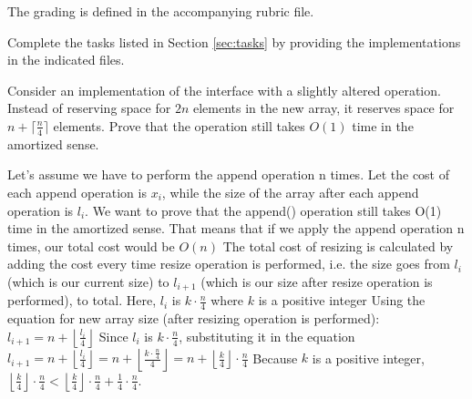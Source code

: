 \documentclass[addpoints]{exam}
\begin{document}
The grading is defined in the accompanying rubric file.
\begin{questions}
   Complete the tasks listed in Section \ref{sec:tasks} by providing the implementations in the indicated files.


  Consider an  implementation of the  interface with a slightly altered  operation. Instead of reserving space for $2n$ elements in the new array, it reserves space for $n + \lceil \frac{n}{4} \rceil$ elements. Prove that the  operation still takes $O(1)$ time in the amortized sense.
  \begin{solution}
    \newline
    Let's assume we have to perform the append operation n times. 
    Let the cost of each append operation is $x_i$, while the size of the array after each append operation is $l_i$. 
    \newline
    \newline
    We want to prove that the append() operation still takes O(1) time in the amortized sense.
    That means that if we apply the append operation n times, our total cost would be $O(n)$
    \newline
    \newline
    The total cost of resizing is calculated by adding the cost every time resize operation is performed, i.e. the size goes from $l_i$ (which is our current size) to $l_{i+1}$ (which is our size after resize operation is performed), to total.  Here, $l_i$ is $k \cdot \frac{n}{4}$ where $k$ is a positive integer
    \newline
    \newline
    Using the equation for new array size (after resizing operation is performed):
    \newline
    \newline
    $l_{i+1} = n + \left\lfloor \frac{l_i}{4} \right\rfloor$
    \newline
    \newline
    Since $l_i$ is $k \cdot \frac{n}{4}$, substituting it in the equation $l_{i+1} = n + \left\lfloor \frac{l_i}{4} \right\rfloor = n + \left\lfloor \frac{k \cdot \frac{n}{4}}{4} \right\rfloor = n + \left\lfloor \frac{k}{4} \right\rfloor \cdot \frac{n}{4}$
    \newline
    \newline
    Because $k$ is a positive integer, $\left\lfloor \frac{k}{4} \right\rfloor \cdot \frac{n}{4} < \left\lfloor \frac{k}{4} \right\rfloor \cdot \frac{n}{4} + \frac{1}{4} \cdot \frac{n}{4}$.

\end{solution}
\end{questions}
\end{document}

